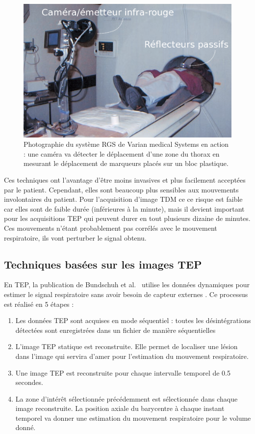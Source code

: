 \begin{figure}[h!]
	\begin{center}
		\includegraphics[width=12cm]{images/varian}
	\end{center}
	\caption{Photographie du système RGS de Varian medical Systems en action : une caméra va détecter le déplacement d'une zone du thorax en mesurant le déplacement de marqueurs placés sur un bloc plastique. } 
	\label{fig:RGSdeVarian}
\end{figure}

Ces techniques ont l'avantage d'être moins invasives et plus facilement acceptées par le patient. Cependant, elles sont beaucoup plus sensibles aux mouvements involontaires du patient. Pour l'acquisition d'image TDM ce ce risque est faible car elles sont de faible durée (inférieures à la minute), mais il devient important pour les acquisitions TEP qui peuvent durer en tout plusieurs dizaine de minutes. Ces mouvements n'étant probablement pas corrélés avec le mouvement respiratoire, ils vont perturber le signal obtenu. 

\subsection{Techniques basées sur les images TEP}
\label{lab:estimMvtTEP}
En TEP, la publication de Bundschuh et al.~\cite{bundschuh2007postacquisition} utilise les données dynamiques pour estimer le signal respiratoire sans avoir besoin de capteur externes . Ce processus est réalisé en 5 étapes : 

\begin{enumerate}
 \item Les données TEP sont acquises en mode séquentiel : toutes les désintégrations détectées sont enregistrées dans un fichier de manière séquentielles  
 \item L'image TEP statique est reconstruite. Elle permet de localiser une lésion dans l'image qui servira d'amer pour l'estimation du mouvement respiratoire.
 \item Une image TEP est reconstruite pour chaque intervalle temporel de 0.5 secondes.
 \item La zone d'intérêt sélectionnée précédemment est sélectionnée dans chaque image reconstruite. La position axiale du barycentre à chaque instant temporel va donner une estimation du mouvement respiratoire pour le volume donné.
\end{enumerate}

